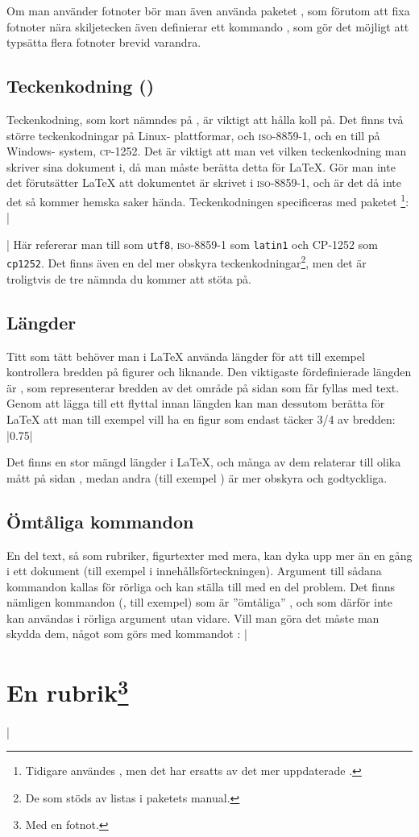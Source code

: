 \documentclass[10pt,../../a4.tex]{subfiles}
\begin{document}
Om man använder fotnoter bör man även använda paketet , som
förutom att fixa fotnoter nära skiljetecken även definierar ett kommando
, som gör det möjligt att typsätta flera fotnoter brevid
varandra.

\subsection{Teckenkodning (\UTF)}
Teckenkodning, som kort nämndes på , är
viktigt att hålla koll på. Det finns två större teckenkodningar på Linux-%
plattformar, \UTF{} och \textsc{iso-8859-1}, och en till på Windows-%
system, \textsc{cp-1252}. Det är viktigt att man vet vilken teckenkodning
man skriver sina dokument i, då man måste berätta detta för \LaTeX. Gör
man inte det förutsätter \LaTeX{} att dokumentet är skrivet i
\textsc{iso-8859-1}, och är det då inte det så kommer hemska saker hända.
Teckenkodningen specificeras med paketet %
\footnote{Tidigare användes , men det har ersatts av det
mer uppdaterade .}:
\latex|\usepackage[<teckenkodning>]{inputenx}|
Här refererar man till \UTF{} som \texttt{utf8}, \textsc{iso-8859-1} som
\texttt{latin1} och \textsc{CP-1252} som \texttt{cp1252}. Det finns även
en del mer obskyra teckenkodningar\footnote{De som stöds av 
 listas i paketets manual.}, men det är troligtvis de tre
nämnda du kommer att stöta på.

\subsection{Längder}
Titt som tätt behöver man i \LaTeX{} använda längder för att till exempel
kontrollera bredden på figurer och liknande. Den viktigaste fördefinierade
längden är , som representerar bredden av det område på
sidan som får fyllas med text. Genom att lägga till ett flyttal innan
längden kan man dessutom berätta för \LaTeX{} att man till exempel vill
ha en figur som endast täcker \num{3/4} av bredden:
\latex|0.75\textwidth|

Det finns en stor mängd längder i \LaTeX, och många av dem relaterar till
olika mått på sidan \parencite[132]{Oetiker11}, medan andra (till exempel
) är mer obskyra och godtyckliga.

\subsection{Ömtåliga kommandon}
En del text, så som rubriker, figurtexter med mera, kan dyka upp mer än en
gång i ett dokument (till exempel i innehållsförteckningen). Argument till
sådana kommandon kallas för rörliga  och kan ställa
till med en del problem. Det finns nämligen kommandon (,
till exempel) som är ”ömtåliga” , och som därför inte kan
användas i rörliga argument utan vidare. Vill man göra det måste man
skydda dem, något som görs med kommandot :
\latex|\section{En rubrik\protect\footnote{Med en fotnot.}}|
\end{document}
